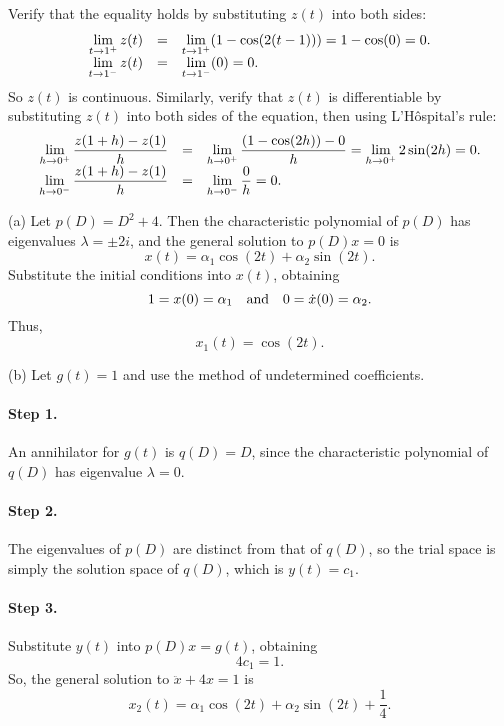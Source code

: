  Verify that the equality holds by substituting $z(t)$ into
both sides:
\[
\begin{array}{rcl}
\displaystyle \lim_{t \rightarrow 1^{+}}z(t) & = &
\displaystyle \lim_{t \rightarrow 1^{+}}(1 - \cos(2(t - 1))) = 1 - \cos(0) = 0. \\
\displaystyle \lim_{t \rightarrow 1^{-}}z(t) & = &
\displaystyle \lim_{t \rightarrow 1^{-}}(0) = 0.
\end{array}
\]
So $z(t)$ is continuous.  Similarly, verify that $z(t)$ is differentiable
by substituting $z(t)$ into both sides of the equation, then using
L'H\^{o}spital's rule:
\[
\begin{array}{rcl}
\displaystyle \lim_{h \rightarrow 0^{+}}\frac{z(1 + h) - z(1)}{h}
& = & \displaystyle \lim_{h \rightarrow 0^{+}}\frac{(1 - \cos(2h)) - 0}{h}
= \displaystyle \lim_{h \rightarrow 0^{+}}2\sin(2h) = 0. \\
\displaystyle \lim_{h \rightarrow 0^{-}}\frac{z(1 + h) - z(1)}{h}
& = & \displaystyle \lim_{h \rightarrow 0^{-}}\frac{0}{h} = 0.
\end{array}
\]

(a) Let $p(D) = D^2 + 4$.  Then the characteristic polynomial of
$p(D)$ has eigenvalues $\lambda = \pm 2i$, and the general solution to
$p(D)x = 0$ is
\[
x(t) = \alpha_1\cos(2t) + \alpha_2\sin(2t).
\]
Substitute the initial conditions into $x(t)$, obtaining
\[
1 = x(0) = \alpha_1 \quad\mbox{and}\quad
0 = \dot{x}(0) = \alpha_2.
\]
Thus,
\[
x_1(t) = \cos(2t).
\]

(b) Let $g(t) = 1$ and use the method of undetermined coefficients.
\paragraph{Step 1.} An annihilator for $g(t)$ is $q(D) = D$, since
the characteristic polynomial of $q(D)$ has eigenvalue $\lambda = 0$.

\paragraph{Step 2.} The eigenvalues of $p(D)$ are distinct from that
of $q(D)$, so the trial space is simply the solution space of $q(D)$,
which is $y(t) = c_1$.

\paragraph{Step 3.} Substitute $y(t)$ into $p(D)x = g(t)$, obtaining
\[
4c_1 = 1.
\]
So, the general solution to $\ddot{x} + 4x = 1$ is
\[
x_2(t) = \alpha_1\cos(2t) + \alpha_2\sin(2t) + \frac{1}{4}.
\]

